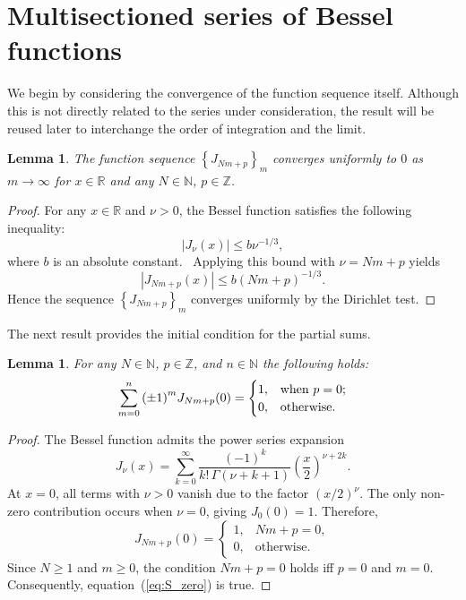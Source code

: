 \documentclass{article}
\newtheorem{lemma}[theorem]{Lemma}
\begin{document}
\section{Multisectioned series of Bessel functions}
\label{sec:plus_series}

We begin by considering the convergence of the function sequence itself.
Although this is not directly related to the series under consideration, the result will be reused later to interchange the order of integration and the limit.

\begin{lemma}
\label{lem:J_conv}
The function sequence $\left\{J_{Nm+p}\right\}_m$ converges uniformly to $0$ as $m \to \infty$ for $x \in \mathbb{R}$ and any $N \in \mathbb{N}$, $p \in \mathbb{Z}$.
\end{lemma}

\begin{proof}
For any $x \in \mathbb{R}$ and $\nu > 0$, the Bessel function satisfies the following inequality:
\begin{equation}
|J_\nu(x)| \le b \nu^{-1/3},
\end{equation}
where $b$ is an absolute constant.~\cite{Landau2000} Applying this bound with $\nu = Nm+p$ yields
\begin{equation}
|J_{Nm+p}(x)| \le b (Nm+p)^{-1/3}.
\end{equation}
Hence the sequence $\left\{J_{Nm+p}\right\}_m$ converges uniformly by the Dirichlet test.
\end{proof}

The next result provides the initial condition for the partial sums.

\begin{lemma}
\label{lem:S_zero}
For any $N \in \mathbb{N}$, $p \in \mathbb{Z}$, and $n \in \mathbb{N}$ the following holds:
\begin{equation}
\label{eq:S_zero}
\sum_{m=0}^{n} \qty(\pm 1)^m J_{Nm+p}(0) = \begin{cases}
1,&\text{when $p=0$;}\\
0,&\text{otherwise.}
\end{cases}
\end{equation}
\end{lemma}

\begin{proof}
The Bessel function admits the power series expansion
\begin{equation}
J_\nu(x) = \sum_{k=0}^{\infty} \frac{(-1)^k}{k! \, \Gamma(\nu+k+1)} \left(\frac{x}{2}\right)^{\nu+2k}.
\end{equation}
At $x=0$, all terms with $\nu>0$ vanish due to the factor $(x/2)^{\nu}$. The only non-zero contribution occurs when $\nu=0$, giving $J_0(0)=1$. Therefore,
\begin{equation}
J_{Nm+p}(0) = \begin{cases}
1, & Nm+p = 0,\\
0, & \text{otherwise}.
\end{cases}
\end{equation}
Since $N \ge 1$ and $m \ge 0$, the condition $Nm+p=0$ holds iff $p=0$ and $m=0$.
Consequently, equation~(\ref{eq:S_zero}) is true.
\end{proof}
\end{document}
